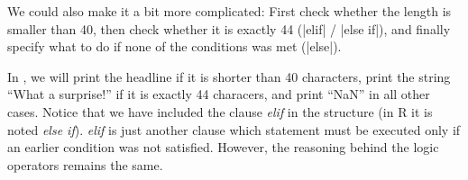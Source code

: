 
We could also make it a bit more complicated: First check whether the length is smaller than 40, then check whether it is exactly 44 (|elif| / |else if|), and finally specify what to do if none of the conditions was met (|else|).

In , we will print the headline if it is shorter than 40 characters, print the string ``What a surprise!'' if it is exactly 44 characers, and print ``NaN'' in all other cases. 
Notice that we have included the clause \emph{elif} in the structure (in R it is noted \emph{else if}). \emph{elif} is just another clause which statement must be executed only if an earlier condition was not satisfied. However, the reasoning behind the logic operators remains the same.

